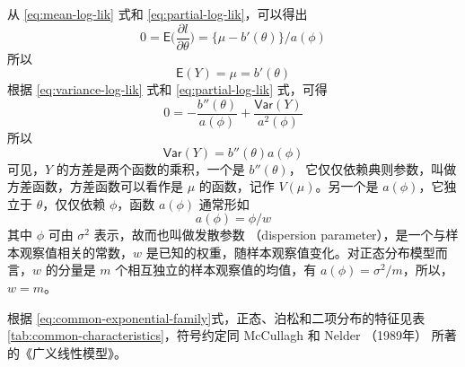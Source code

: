\documentclass[12pt,a4paper,UTF8,twoside]{book}
\theoremstyle{definition}
\theoremstyle{definition}
\theoremstyle{definition}
\theoremstyle{remark}
\begin{document}
\noindent 从 \eqref{eq:mean-log-lik} 式和 \eqref{eq:partial-log-lik}，可以得出
\[ 
0 = \mathsf{E}\big( \frac{\partial l}{\partial \theta} \big) = \big\{ \mu - b'(\theta) \big\}/a(\phi)
\]
\noindent 所以
\[ \mathsf{E}(Y) = \mu = b'(\theta) \]
\noindent 根据 \eqref{eq:variance-log-lik} 式和 \eqref{eq:partial-log-lik} 式，可得
\[ 0 = - \frac{b''(\theta)}{a(\phi)} + \frac{\mathsf{Var}(Y)}{a^2(\phi)} \]
\noindent 所以
\[ \mathsf{Var}(Y) = b''(\theta)a(\phi) \]
可见，\(Y\) 的方差是两个函数的乘积，一个是 \(b''(\theta)\)， 它仅仅依赖典则参数，叫做方差函数，方差函数可以看作是 \(\mu\) 的函数，记作 \(V(\mu)\)。另一个是 \(a(\phi)\)，它独立于 \(\theta\)，仅仅依赖 \(\phi\)，函数 \(a(\phi)\) 通常形如
\[ a(\phi) = \phi/w \]
\noindent 其中 \(\phi\) 可由 \(\sigma^2\) 表示，故而也叫做发散参数 （dispersion parameter），是一个与样本观察值相关的常数，\(w\) 是已知的权重，随样本观察值变化。对正态分布模型而言，\(w\) 的分量是 \(m\) 个相互独立的样本观察值的均值，有 \(a(\phi) = \sigma^2/m\)，所以，\(w = m\)。

根据 \eqref{eq:common-exponential-family}式，正态、泊松和二项分布的特征见表 \ref{tab:common-characteristics}，符号约定同 McCullagh 和 Nelder （1989年） 所著的《广义线性模型》。
\end{document}
